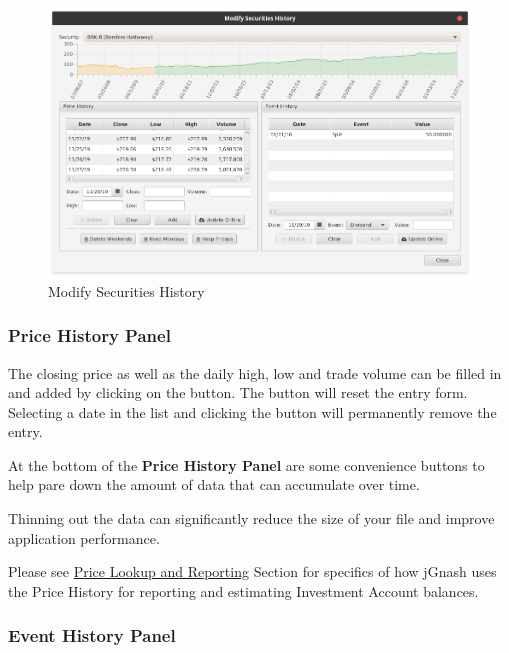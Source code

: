\documentclass[letterpaper,12pt]{book}
\begin{document}
     \begin{figure}[h]                          
        \caption{Modify Securities History}                  
        \label{fig:securitieshistorydialog}   
        \includegraphics[width=1.0\linewidth]{images/modifySecurityHistory}
    \end{figure}
    
    \subsubsection{Price History Panel}
        
    The closing price as well as the daily high, low and trade volume can be filled in and added by clicking
    on the  button.  The  button will reset the entry form.  Selecting a date in the list
    and clicking the  button will permanently remove the entry.
    
    At the bottom of the \textbf{Price History Panel} are some convenience buttons to help pare down the amount of data
    that can accumulate over time.  
    
    Thinning out the data can significantly reduce the size of your file and improve application performance.
    
    Please see \hyperref[sec:pricelookup]{Price Lookup and Reporting} Section for specifics of how jGnash uses
    the Price History for reporting and estimating Investment Account balances.
    
    \subsubsection{Event History Panel}
    
\end{document}
